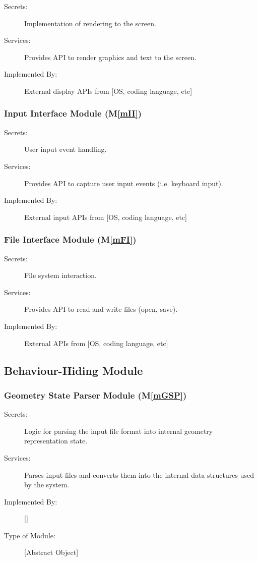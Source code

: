\documentclass[12pt, titlepage]{article}
\newcommand{\mref}[1]{M\ref{#1}}
\begin{document}
\begin{description}
\item[Secrets:] Implementation of rendering to the screen.
\item[Services:] Provides API to render graphics and text to the
  screen.
\item[Implemented By:] External display APIs from [OS, coding language, etc] 
\end{description}

\subsubsection{Input Interface Module (\mref{mII})}

\begin{description}
\item[Secrets:] User input event handling.
\item[Services:] Provides API to capture user input events (i.e. keyboard input).
\item[Implemented By:] External input APIs from [OS, coding language, etc]
\end{description}

\subsubsection{File Interface Module (\mref{mFI})}

\begin{description}
\item[Secrets:] File system interaction.
\item[Services:] Provides API to read and write files (open, save).
\item[Implemented By:] External APIs from [OS, coding language, etc]
\end{description}

\subsection{Behaviour-Hiding Module}

\subsubsection{Geometry State Parser Module (\mref{mGSP})}

\begin{description}
\item[Secrets:]Logic for parsing the input file format into internal geometry representation state.
\item[Services:]Parses input files and converts them into the internal data structures used by the system.
\item[Implemented By:] [\progname{}]
\item[Type of Module:] [Abstract Object]
\end{description}
\end{document}
